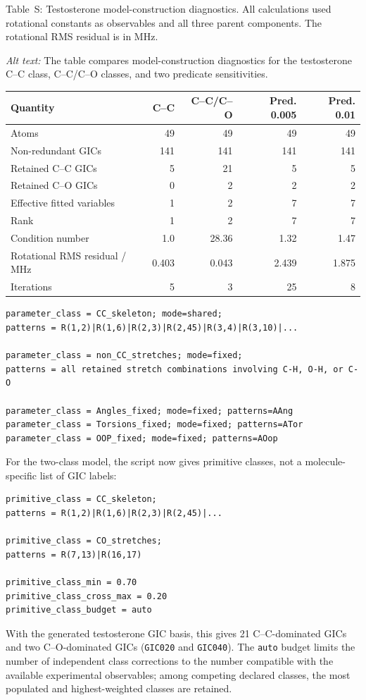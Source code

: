 \documentclass[12pt]{article}
\renewcommand{\thetable}{S\arabic{table}}
\begin{document}
\begin{center}
\label{tab:si-testosterone-diagnostics}
\parbox{0.94\linewidth}{\small Table~\thetable: Testosterone
model-construction diagnostics. All calculations used rotational constants as
observables and all three parent components. The rotational RMS residual is in
MHz.}
\par\smallskip\noindent\textit{Alt text:} The table compares model-construction diagnostics for the testosterone C--C class, C--C/C--O classes, and two predicate sensitivities.

\smallskip
\begin{tabular}{lrrrr}
\toprule
Quantity & C--C & C--C/C--O & Pred. 0.005 & Pred. 0.01 \\
\midrule
Atoms & 49 & 49 & 49 & 49 \\
Non-redundant GICs & 141 & 141 & 141 & 141 \\
Retained C--C GICs & 5 & 21 & 5 & 5 \\
Retained C--O GICs & 0 & 2 & 2 & 2 \\
Effective fitted variables & 1 & 2 & 7 & 7 \\
Rank & 1 & 2 & 7 & 7 \\
Condition number & 1.0 & 28.36 & 1.32 & 1.47 \\
Rotational RMS residual / MHz & 0.403 & 0.043 & 2.439 & 1.875 \\
Iterations & 5 & 3 & 25 & 8 \\
\bottomrule
\end{tabular}
\end{center}

\begin{lstlisting}
parameter_class = CC_skeleton; mode=shared;
patterns = R(1,2)|R(1,6)|R(2,3)|R(2,45)|R(3,4)|R(3,10)|...

parameter_class = non_CC_stretches; mode=fixed;
patterns = all retained stretch combinations involving C-H, O-H, or C-O

parameter_class = Angles_fixed; mode=fixed; patterns=AAng
parameter_class = Torsions_fixed; mode=fixed; patterns=ATor
parameter_class = OOP_fixed; mode=fixed; patterns=AOop
\end{lstlisting}

For the two-class model, the script now gives primitive classes, not a
molecule-specific list of GIC labels:
\begin{lstlisting}
primitive_class = CC_skeleton;
patterns = R(1,2)|R(1,6)|R(2,3)|R(2,45)|...

primitive_class = CO_stretches;
patterns = R(7,13)|R(16,17)

primitive_class_min = 0.70
primitive_class_cross_max = 0.20
primitive_class_budget = auto
\end{lstlisting}
With the generated testosterone GIC basis, this gives 21 C--C-dominated GICs
and two C--O-dominated GICs (\texttt{GIC020} and \texttt{GIC040}). The
\texttt{auto} budget limits the number of independent class corrections to the
number compatible with the available experimental observables; among competing
declared classes, the most populated and highest-weighted classes are retained.
\end{document}
